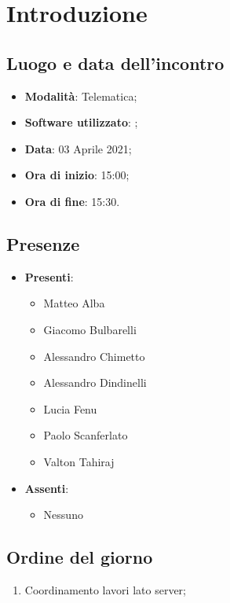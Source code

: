 \documentclass[]{article}
\begin{document}
	

	\newpage


		\section{Introduzione}
		\subsection{Luogo e data dell'incontro}
		\begin{itemize}
			\item \textbf{Modalità}: Telematica;
			\item \textbf{Software utilizzato}: ;
			\item \textbf{Data}: 03 Aprile 2021;
			\item \textbf{Ora di inizio}: 15:00;
			\item \textbf{Ora di fine}: 15:30.
		\end{itemize}

		\subsection{Presenze}
		\begin{itemize}
			\item \textbf{Presenti}:
			\begin{itemize}
				\item Matteo Alba
				\item Giacomo Bulbarelli
				\item Alessandro Chimetto
				\item Alessandro Dindinelli
				\item Lucia Fenu
				\item Paolo Scanferlato
				\item Valton Tahiraj
			\end{itemize}
			\item \textbf{Assenti}:
			\begin{itemize}
				\item Nessuno
			\end{itemize}
		\end{itemize}


		\subsection{Ordine del giorno}
		\begin{enumerate}
			\item Coordinamento lavori lato server;
		\end{enumerate}
\end{document}
